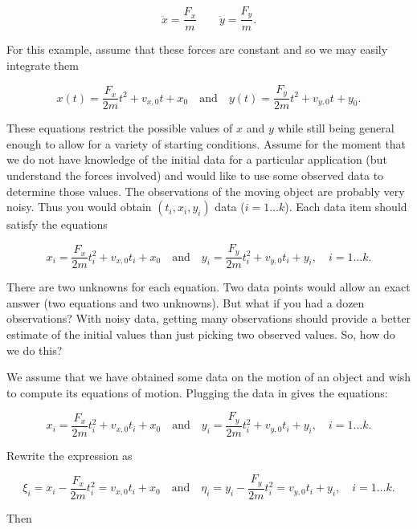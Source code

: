 \[\ddot{x} = \frac{F_x}{m} \quad \quad \ddot{y} = \frac{F_y}{m} .\]

For this example, assume that these forces are constant and so we may
easily integrate them

\[x(t) =  \frac{F_x}{2m} t^2 + v_{x,0} t + x_0 \quad \mbox{and} \quad y(t) =  \frac{F_y}{2m} t^2 + v_{y,0} t + y_0 .\]

These equations restrict the possible values of \(x\) and \(y\) while
still being general enough to allow for a variety of starting
conditions. Assume for the moment that we do not have knowledge of the
initial data for a particular application (but understand the forces
involved) and would like to use some observed data to determine those
values. The observations of the moving object are probably very noisy.
Thus you would obtain \((t_i, x_i,y_i)\) data (\(i=1 \dots k\)). Each
data item should satisfy the equations

\[x_i =  \frac{F_x}{2m} t_i^2 + v_{x,0} t_i + x_0 \quad \mbox{and} \quad y_i =  \frac{F_y}{2m} t_i^2 + v_{y,0} t_i + y_i, \quad i=1 \dots k .\]

There are two unknowns for each equation. Two data points would allow an
exact answer (two equations and two unknowns). But what if you had a
dozen observations? With noisy data, getting many observations should
provide a better estimate of the initial values than just picking two
observed values. So, how do we do this?

We assume that we have obtained some data on the motion of an object and
wish to compute its equations of motion. Plugging the data in gives the
equations:

\[x_i =  \frac{F_x}{2m} t_i^2 + v_{x,0} t_i + x_0 \quad \mbox{and} \quad y_i =  \frac{F_y}{2m} t_i^2 + v_{y,0} t_i + y_i, \quad i=1 \dots k .\]

Rewrite the expression as

\[\xi_i = x_i -  \frac{F_x}{2m} t_i^2 = v_{x,0} t_i + x_0 \quad \mbox{and} \quad \eta_i = y_i -  \frac{F_y}{2m} t_i^2 = v_{y,0} t_i + y_i, \quad i=1 \dots k .\]

Then

